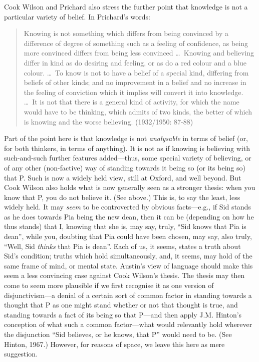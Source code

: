 Cook Wilson and Prichard also stress the further point that knowledge is not a particular variety of belief. In Prichard’s words:
\begin{quote}
	Knowing is not something which differs from being convinced by a difference of degree of something such as a feeling of confidence, as being more convinced differs from being less convinced \ldots\ Knowing and believing differ in kind as do desiring and feeling, or as do a red colour and a blue colour. \ldots\ To know is not to have a belief of a special kind, differing from beliefs of other kinds; and no improvement in a belief and no increase in the feeling of conviction which it implies will convert it into knowledge. \ldots\ It is not that there is a general kind of activity, for which the name would have to be thinking, which admits of two kinds, the better of which is knowing and the worse believing. (1932/1950: 87-88)
\end{quote}
Part of the point here is that knowledge is not \emph{analysable} in terms of belief (or, for both thinkers, in terms of anything). It is not as if knowing is believing with such-and-such further features added---thus, some special variety of believing, or of any other (non-factive) way of standing towards it being so (or its being so) that P. Such is now a widely held view, still at Oxford, and well beyond. But Cook Wilson also holds what is now generally seen as a stronger thesis: when you know that P, you do not believe it. (See above.) This is, to say the least, less widely held. It may \emph{seem} to be controverted by obvious facts---e.g., if Sid stands as he does towards Pia being the new dean, then it can be (depending on how he thus stands) that I, knowing that she is, may say, truly, ``Sid knows that Pia is dean'', while you, doubting that Pia could have been chosen, may say, also truly, ``Well, Sid \emph{thinks} that Pia is dean''. Each of us, it seems, states a truth about Sid's condition; truths which hold simultaneously, and, it seems, may hold of the same frame of mind, or mental state. Austin's view of language should make this seem a less convincing case against Cook Wilson's thesis. The thesis may then come to seem more plausible if we first recognise it as one version of disjunctivism---a denial of a certain sort of common factor in standing towards a thought that P as one might stand whether or not that thought is true, and standing towards a fact of its being so that P---and then apply J.M. Hinton's conception of what such a common factor---what would relevantly hold wherever the disjunction ``Sid believes, or he knows, that P'' would need to be. (See Hinton, 1967.) However, for reasons of space, we leave this here as mere suggestion.

